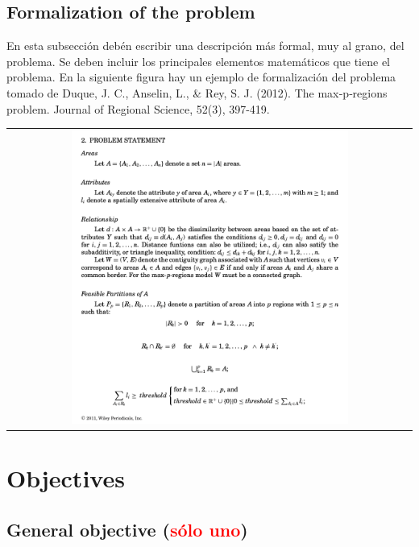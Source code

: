 \documentclass[12pt,letterpaper]{article}
\begin{document}
\subsection{Formalization of the problem}

En esta subsección debén escribir una descripción más formal, muy al grano,
del problema.  Se deben incluir los principales elementos matemáticos que
tiene el problema.  En la siguiente figura hay un ejemplo de formalización del
problema tomado de Duque, J. C., Anselin, L., \& Rey, S. J. (2012). The
max‐p‐regions problem. Journal of Regional Science, 52(3), 397-419.


 \begin{center}
  \begin{tabular}{c}
    \includegraphics[width=0.70\textwidth]{problem_statement}
  \end{tabular}
\end{center}


\section{Objectives}

\subsection{General objective (\textcolor{red}{sólo uno})}

\end{document}
